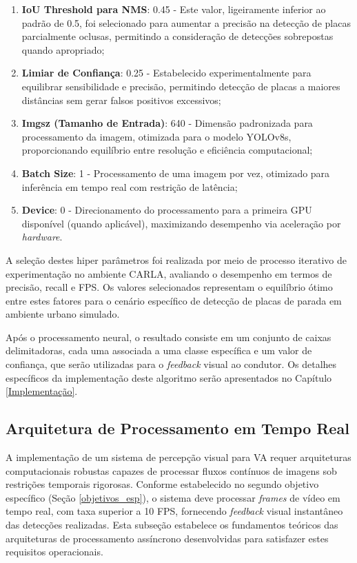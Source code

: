 \begin{enumerate}
    \item \textbf{IoU Threshold para NMS}: 0.45 - Este valor, ligeiramente inferior ao padrão de 0.5, foi selecionado para aumentar a precisão na detecção de placas parcialmente oclusas, permitindo a consideração de detecções sobrepostas quando apropriado;
    
    \item \textbf{Limiar de Confiança}: 0.25 - Estabelecido experimentalmente para equilibrar sensibilidade e precisão, permitindo detecção de placas a maiores distâncias sem gerar falsos positivos excessivos;
    
    \item \textbf{Imgsz (Tamanho de Entrada)}: 640 - Dimensão padronizada para processamento da imagem, otimizada para o modelo YOLOv8s, proporcionando equilíbrio entre resolução e eficiência computacional;
    
    \item \textbf{Batch Size}: 1 - Processamento de uma imagem por vez, otimizado para inferência em tempo real com restrição de latência;
    
    \item \textbf{Device}: 0 - Direcionamento do processamento para a primeira GPU disponível (quando aplicável), maximizando desempenho via aceleração por \textit{hardware}.
\end{enumerate}

A seleção destes hiper parâmetros foi realizada por meio de processo iterativo de experimentação no ambiente CARLA, avaliando o desempenho em termos de precisão, recall e FPS. Os valores selecionados representam o equilíbrio ótimo entre estes fatores para o cenário específico de detecção de placas de parada em ambiente urbano simulado.

Após o processamento neural, o resultado consiste em um conjunto de caixas delimitadoras, cada uma associada a uma classe específica e um valor de confiança, que serão utilizadas para o \textit{feedback} visual ao condutor. Os detalhes específicos da implementação deste algoritmo serão apresentados no Capítulo \ref{Implementação}.

\subsection{Arquitetura de Processamento em Tempo Real} \label{subsec:arquitetura_tempo_real}

A implementação de um sistema de percepção visual para VA requer arquiteturas computacionais robustas capazes de processar fluxos contínuos de imagens sob restrições temporais rigorosas. Conforme estabelecido no segundo objetivo específico (Seção \ref{objetivos_esp}), o sistema deve processar \textit{frames} de vídeo em tempo real, com taxa superior a 10 FPS, fornecendo \textit{feedback} visual instantâneo das detecções realizadas. Esta subseção estabelece os fundamentos teóricos das arquiteturas de processamento assíncrono desenvolvidas para satisfazer estes requisitos operacionais.

